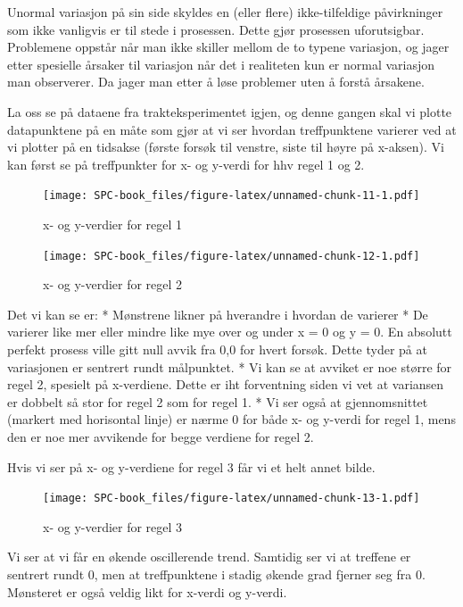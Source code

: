 \documentclass[
]{book}
\begin{document}
Unormal variasjon på sin side skyldes en (eller flere) ikke-tilfeldige påvirkninger som ikke vanligvis er til stede i prosessen. Dette gjør prosessen uforutsigbar. Problemene oppstår når man ikke skiller mellom de to typene variasjon, og jager etter spesielle årsaker til variasjon når det i realiteten kun er normal variasjon man observerer. Da jager man etter å løse problemer uten å forstå årsakene.

La oss se på dataene fra trakteksperimentet igjen, og denne gangen skal vi plotte datapunktene på en måte som gjør at vi ser hvordan treffpunktene varierer ved at vi plotter på en tidsakse (første forsøk til venstre, siste til høyre på x-aksen). Vi kan først se på treffpunkter for x- og y-verdi for hhv regel 1 og 2.

\begin{figure}
\centering
\texttt{[image: SPC-book\_files/figure-latex/unnamed-chunk-11-1.pdf]}
\caption{\label{fig:unnamed-chunk-11}x- og y-verdier for regel 1}
\end{figure}

\begin{figure}
\centering
\texttt{[image: SPC-book\_files/figure-latex/unnamed-chunk-12-1.pdf]}
\caption{\label{fig:unnamed-chunk-12}x- og y-verdier for regel 2}
\end{figure}

Det vi kan se er:
* Mønstrene likner på hverandre i hvordan de varierer
* De varierer like mer eller mindre like mye over og under x = 0 og y = 0. En absolutt perfekt prosess ville gitt null avvik fra 0,0 for hvert forsøk. Dette tyder på at variasjonen er sentrert rundt målpunktet.
* Vi kan se at avviket er noe større for regel 2, spesielt på x-verdiene. Dette er iht forventning siden vi vet at variansen er dobbelt så stor for regel 2 som for regel 1.
* Vi ser også at gjennomsnittet (markert med horisontal linje) er nærme 0 for både x- og y-verdi for regel 1, mens den er noe mer avvikende for begge verdiene for regel 2.

Hvis vi ser på x- og y-verdiene for regel 3 får vi et helt annet bilde.

\begin{figure}
\centering
\texttt{[image: SPC-book\_files/figure-latex/unnamed-chunk-13-1.pdf]}
\caption{\label{fig:unnamed-chunk-13}x- og y-verdier for regel 3}
\end{figure}

Vi ser at vi får en økende oscillerende trend. Samtidig ser vi at treffene er sentrert rundt 0, men at treffpunktene i stadig økende grad fjerner seg fra 0. Mønsteret er også veldig likt for x-verdi og y-verdi.
\end{document}
